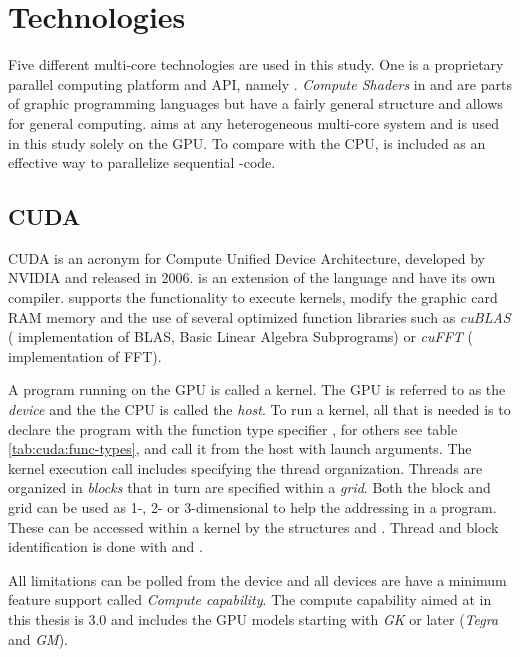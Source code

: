 \chapter{Technologies}

\newcommand{\procwidth}{{\textwidth * 3 / 4}}

Five different multi-core technologies are used in this study. One is a proprietary parallel computing platform and API, namely {\CU}. \textit{Compute Shaders} in {\GL} and {\DX} are parts of graphic programming languages but have a fairly general structure and allows for general computing. {\OCL} aims at any heterogeneous multi-core system and is used in this study solely on the GPU. To compare with the CPU, {\OMP} is included as an effective way to parallelize sequential {\CPP}-code.

\section{CUDA}

CUDA is an acronym for Compute Unified Device Architecture, developed by NVIDIA and released in 2006. {\CU} is an extension of the {\CPP} language and have its own compiler. {\CU} supports the functionality to execute kernels, modify the graphic card RAM memory and the use of several optimized function libraries such as \textit{cuBLAS} ({\CU} implementation of BLAS, Basic Linear Algebra Subprograms) or \textit{cuFFT} ({\CU} implementation of FFT).

A program running on the GPU is called a kernel. The GPU is referred to as the \textit{device} and the the CPU is called the \textit{host}. To run a {\CU} kernel, all that is needed is to declare the program with the function type specifier , for others see table \ref{tab:cuda:func-types}, and call it from the host with launch arguments. The kernel execution call includes specifying the thread organization. Threads are organized in \emph{blocks} that in turn are specified within a \emph{grid}. Both the block and grid can be used as 1-, 2- or 3-dimensional to help the addressing in a program. These can be accessed within a kernel by the structures  and . Thread and block identification is done with  and .

All limitations can be polled from the device and all devices are have a minimum feature support called \emph{Compute capability}. The compute capability aimed at in this thesis is $3.0$ and includes the GPU models starting with \emph{GK} or later (\emph{Tegra} and \emph{GM}).

